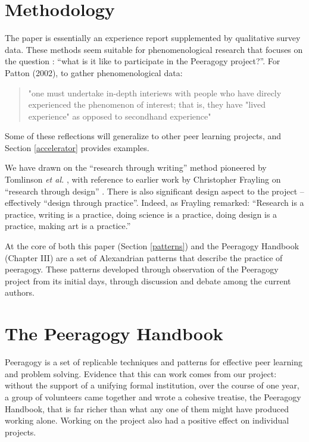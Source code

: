 \documentclass{acm_proc_article-sp}
\begin{document}
\section{Methodology}

The paper is essentially an experience report supplemented by qualitative survey data. These methods seem suitable for phenomenological research that focuses on the question : ``what is it like to participate in the Peeragogy project?''. For Patton (2002), to gather phenomenological data: 
\begin{quote}
"one must undertake in-depth interiews with people who have direcly experienced the phenomenon of interest; that is, they have "lived experience" as opposed to secondhand experience"
\end{quote}
Some of these reflections will generalize to other peer learning projects, and Section \ref{accelerator} provides examples.

We have drawn on the ``research through writing'' method pioneered by Tomlinson \emph{et al.} \cite{tomlinson2012massively}, with reference to earlier work by Christopher Frayling on ``research through design'' \cite{frayling1993research}.  There is also significant design aspect to the project -- effectively ``design through practice''.  Indeed, as Frayling remarked: ``Research is a practice, writing is a practice, doing science is a practice, doing design is a practice, making art is a practice.''

At the core of both this paper (Section \ref{patterns}) and the Peeragogy Handbook (Chapter III) are a set of Alexandrian  patterns that describe the practice of peeragogy.  These patterns developed through observation of the Peeragogy project from its initial days, through discussion and debate among the current authors.

\section{The Peeragogy Handbook}

Peeragogy is a set of replicable techniques and patterns for effective
peer learning and problem solving.  Evidence that this can work comes
from our project: without the support of a unifying formal
institution, over the course of one year, a group of volunteers came
together and wrote a cohesive treatise, the Peeragogy Handbook, that is far richer
than what any one of them might have produced working alone.  Working on the project also had a positive effect on individual projects.
\end{document}
